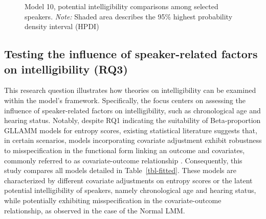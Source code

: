 \documentclass[
  authoryear,
  preprint,
  1p]{elsarticle}
\begin{document}
\label{cell-fig-si_contr_model10}
\begin{figure}[H]


\caption{\label{fig-si_contr_model10}Model 10, potential intelligibility
comparisons among selected speakers. \emph{Note:} Shaded area describes
the 95\% highest probability density interval (HPDI)}

\end{figure}%

\subsection{Testing the influence of speaker-related factors on
intelligibility (RQ3)}\label{sec-R-RQ3}

This research question illustrates how theories on intelligibility can
be examined within the model's framework. Specifically, the focus
centers on assessing the influence of speaker-related factors on
intelligibility, such as chronological age and hearing status. Notably,
despite RQ1 indicating the suitability of Beta-proportion GLLAMM models
for entropy scores, existing statistical literature suggests that, in
certain scenarios, models incorporating covariate adjustment exhibit
robustness to misspecification in the functional form linking an outcome
and covariates, commonly referred to as covariate-outcome relationship
\citep{Tackney_et_al_2023}. Consequently, this study compares all models
detailed in Table~\ref{tbl-fitted}. These models are characterized by
different covariate adjustments on entropy scores or the latent
potential intelligibility of speakers, namely chronological age and
hearing status, while potentially exhibiting misspecification in the
covariate-outcome relationship, as observed in the case of the Normal
LMM.
\end{document}
